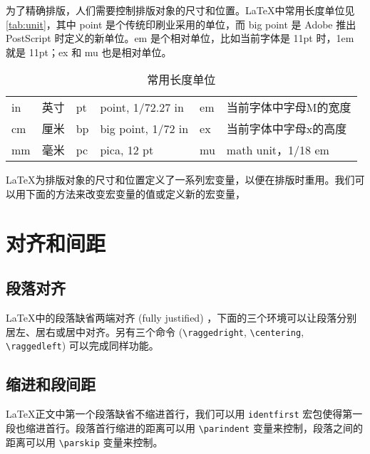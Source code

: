 为了精确排版，人们需要控制排版对象的尺寸和位置。\LaTeX 中常用长度单位见 \autoref{tab:unit}，其中 point 是个传统印刷业采用的单位，而 big point 是 Adobe 推出 PostScript 时定义的新单位。em 是个相对单位，比如当前字体是 11pt 时，1em 就是 11pt；ex 和 mu 也是相对单位。

\begin{table}[htbp]
\caption{常用长度单位}
\label{tab:unit}
\centering
\begin{tabular}{llllll}
  \toprule
  in & 英寸 & pt & point, 1/72.27 in  & em & 当前字体中字母M的宽度 \\
  cm & 厘米 & bp & big point, 1/72 in & ex & 当前字体中字母x的高度 \\
  mm & 毫米 & pc & pica, 12 pt        & mu & math unit，1/18 em \\
  \bottomrule
\end{tabular}
\end{table}

\LaTeX 为排版对象的尺寸和位置定义了一系列宏变量，以便在排版时重用。我们可以用下面的方法来改变宏变量的值或定义新的宏变量，

\begin{Code}[]
\setlength{`变量名`}   %
\addtolength{`变量名`} %
\end{Code}

\section{对齐和间距}

\subsection{段落对齐}

\LaTeX 中的段落缺省两端对齐 (fully justified) ，下面的三个环境可以让段落分别居左、居右或居中对齐。另有三个命令 (\verb|\raggedright|, \verb|\centering|, \verb|\raggedleft|) 可以完成同样功能。

\begin{example}[h]
\caption{段落对齐方式}
\end{example}

\subsection{缩进和段间距}
\label{sec:parskip}

\LaTeX 正文中第一个段落缺省不缩进首行，我们可以用 \texttt{identfirst} 宏包使得第一段也缩进首行。段落首行缩进的距离可以用 \verb|\parindent| 变量来控制，段落之间的距离可以用 \verb|\parskip| 变量来控制。


